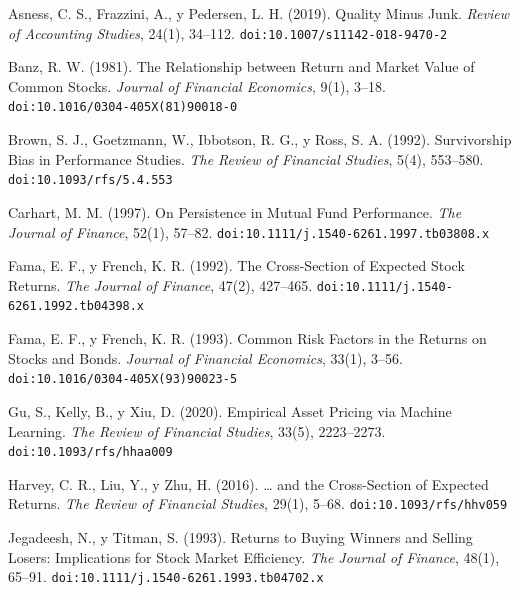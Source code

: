 \begin{list}{}{%
  \setlength{\leftmargin}{2em}%
  \setlength{\itemindent}{-2em}%
  \setlength{\itemsep}{0.6em}%
  \setlength{\parsep}{0pt}%
}

\item Asness, C. S., Frazzini, A., y Pedersen, L. H. (2019). Quality Minus Junk.
  \textit{Review of Accounting Studies}, 24(1), 34--112.
  \texttt{doi:10.1007/s11142-018-9470-2}

\item Banz, R. W. (1981). The Relationship between Return and Market Value of Common Stocks.
  \textit{Journal of Financial Economics}, 9(1), 3--18.
  \texttt{doi:10.1016/0304-405X(81)90018-0}

\item Brown, S. J., Goetzmann, W., Ibbotson, R. G., y Ross, S. A. (1992). Survivorship Bias in
  Performance Studies. \textit{The Review of Financial Studies}, 5(4), 553--580.
  \texttt{doi:10.1093/rfs/5.4.553}

\item Carhart, M. M. (1997). On Persistence in Mutual Fund Performance.
  \textit{The Journal of Finance}, 52(1), 57--82.
  \texttt{doi:10.1111/j.1540-6261.1997.tb03808.x}

\item Fama, E. F., y French, K. R. (1992). The Cross-Section of Expected Stock Returns.
  \textit{The Journal of Finance}, 47(2), 427--465.
  \texttt{doi:10.1111/j.1540-6261.1992.tb04398.x}

\item Fama, E. F., y French, K. R. (1993). Common Risk Factors in the Returns on Stocks and Bonds.
  \textit{Journal of Financial Economics}, 33(1), 3--56.
  \texttt{doi:10.1016/0304-405X(93)90023-5}

\item Gu, S., Kelly, B., y Xiu, D. (2020). Empirical Asset Pricing via Machine Learning.
  \textit{The Review of Financial Studies}, 33(5), 2223--2273.
  \texttt{doi:10.1093/rfs/hhaa009}

\item Harvey, C. R., Liu, Y., y Zhu, H. (2016). \ldots{} and the Cross-Section of Expected Returns.
  \textit{The Review of Financial Studies}, 29(1), 5--68.
  \texttt{doi:10.1093/rfs/hhv059}

\item Jegadeesh, N., y Titman, S. (1993). Returns to Buying Winners and Selling Losers: Implications
  for Stock Market Efficiency. \textit{The Journal of Finance}, 48(1), 65--91.
  \texttt{doi:10.1111/j.1540-6261.1993.tb04702.x}


\end{list}
